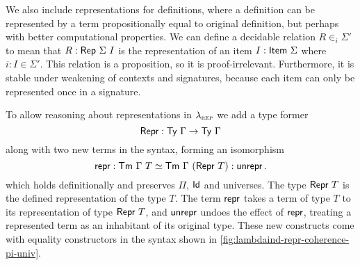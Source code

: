 We also include representations for definitions, where a definition can be
represented by a term propositionally equal to original definition, but perhaps
with better computational properties.
We can define a decidable relation $R \in_i \Sigma'$ to mean that $R :
\textsf{Rep}\ \Sigma\ I$ is the representation of an item $I : \textsf{Item}\ \Sigma$
where $i : I \in \Sigma'$.
This relation is a proposition, so it is proof-irrelevant. Furthermore, it is stable under
weakening of contexts and signatures, because each item can only be represented once in a signature.

To allow reasoning about representations in $\lambda_{\textsc{rep}}$ we add a type former
\begin{equation}\label{eq:repr-ty}
	\textsf{Repr}{} : \textsf{Ty}\ \Gamma \to \textsf{Ty}\ \Gamma
\end{equation}
along with two new terms in the syntax, forming an isomorphism
\begin{equation}\label{eq:repr-iso}
	\textsf{repr}{} : \textsf{Tm}\ \Gamma\ T \simeq \textsf{Tm}\ \Gamma\ (\textsf{Repr}\ T) : \textsf{unrepr}{} \,.
\end{equation}
which holds definitionally and preserves $\Pi$, $\textsf{Id}$ and universes. The
type $\MRepr\ T$ is the defined representation of the type $T$. The term
$\textsf{repr}{}$ takes a term of type $T$ to its representation of type $\MRepr\ T$,
and $\textsf{unrepr}{}$ undoes the
effect of $\textsf{repr}{}$, treating a represented term as an inhabitant of its
original type. These new constructs come with equality constructors in the syntax
shown in \cref{fig:lambdaind-repr-coherence-pi-univ}.


